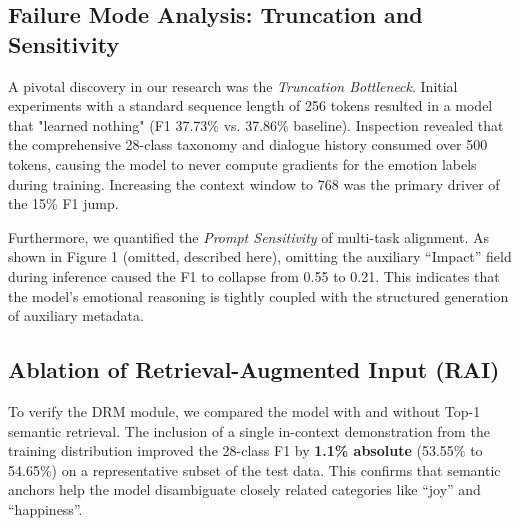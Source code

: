 \documentclass[11pt]{article}
\begin{document}
\begin{table}[ht]
\centering
\caption{Comparative performance on EmpatheticDialogues (ED) and GoEmotions (GE). All F1 scores are weighted.}
\end{table}

\subsection{Failure Mode Analysis: Truncation and Sensitivity}
A pivotal discovery in our research was the \textit{Truncation Bottleneck}. Initial experiments with a standard sequence length of 256 tokens resulted in a model that "learned nothing" (F1 37.73\% vs. 37.86\% baseline). Inspection revealed that the comprehensive 28-class taxonomy and dialogue history consumed over 500 tokens, causing the model to never compute gradients for the emotion labels during training. Increasing the context window to 768 was the primary driver of the 15\% F1 jump.

Furthermore, we quantified the \textit{Prompt Sensitivity} of multi-task alignment. As shown in Figure 1 (omitted, described here), omitting the auxiliary ``Impact'' field during inference caused the F1 to collapse from 0.55 to 0.21. This indicates that the model's emotional reasoning is tightly coupled with the structured generation of auxiliary metadata.

\subsection{Ablation of Retrieval-Augmented Input (RAI)}
To verify the DRM module, we compared the model with and without Top-1 semantic retrieval. The inclusion of a single in-context demonstration from the training distribution improved the 28-class F1 by \textbf{1.1\% absolute} (53.55\% to 54.65\%) on a representative subset of the test data. This confirms that semantic anchors help the model disambiguate closely related categories like ``joy'' and ``happiness''.
\end{document}
